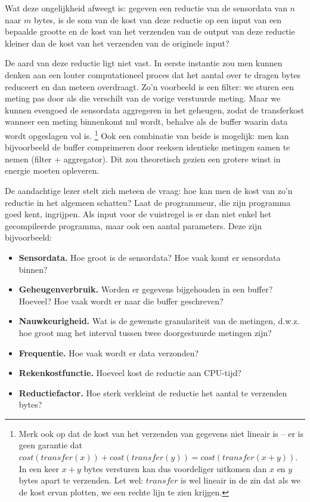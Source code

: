 \documentclass[11pt]{article}
\begin{document}
Wat deze ongelijkheid afweegt is: gegeven een reductie van de sensordata van $n$ naar
$m$ bytes, is de som van de kost van deze reductie op een input van een bepaalde
grootte en de kost van het verzenden van de output van deze reductie kleiner dan
de kost van het verzenden van de originele input?

De aard van deze reductie ligt niet vast. In eerste instantie zou men kunnen
denken aan een louter computationeel proces dat het aantal over te dragen bytes
reduceert en dan meteen overdraagt. Zo'n voorbeeld is een filter: we sturen een
meting pas door als die verschilt van de vorige verstuurde meting. Maar we
kunnen evengoed de sensordata aggregeren in het geheugen, zodat de transferkost
wanneer een meting binnenkomt nul wordt, behalve als de buffer waarin data wordt
opgeslagen vol is. \footnote{Merk ook op dat de kost van het verzenden van gegevens
niet lineair is -- er is geen garantie dat $cost(transfer(x)) +
cost(transfer(y)) = cost(transfer(x + y))$. In een keer $x + y$ bytes versturen
kan dus voordeliger uitkomen dan $x$ en $y$ bytes apart te verzenden. Let wel: $transfer$ is wel lineair in de zin dat als we de kost ervan plotten, we een rechte lijn te zien krijgen. } 
Ook een combinatie van beide is mogelijk: men kan bijvoorbeeld de buffer
comprimeren door reeksen identieke metingen samen te nemen (filter +
aggregator). Dit zou theoretisch gezien een grotere winst in energie moeten opleveren.

De aandachtige lezer stelt zich meteen de vraag: hoe kan men de kost van zo'n
reductie in het algemeen schatten? Laat de programmeur, die zijn programma goed
kent, ingrijpen. Als input voor de vuistregel is er dan niet enkel het
gecompileerde programma, maar ook een aantal parameters. Deze zijn bijvoorbeeld:

\begin{itemize}
\item \textbf{Sensordata.} Hoe groot is de sensordata? Hoe vaak komt er sensordata binnen?
\item \textbf{Geheugenverbruik.} Worden er gegevens bijgehouden in een buffer? Hoeveel? Hoe vaak wordt er naar die buffer geschreven?
\item \textbf{Nauwkeurigheid.} Wat is de gewenste granulariteit van de metingen, d.w.z. hoe groot mag het interval tussen twee doorgestuurde metingen zijn?
\item \textbf{Frequentie.} Hoe vaak wordt er data verzonden?
\item \textbf{Rekenkostfunctie.} Hoeveel kost de reductie aan CPU-tijd?
\item \textbf{Reductiefactor.} Hoe sterk verkleint de reductie het aantal te verzenden bytes?
\end{itemize}
\end{document}
